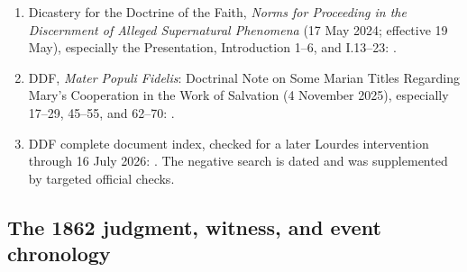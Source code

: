\begin{enumerate}
  \item Dicastery for the Doctrine of the Faith, \emph{Norms for Proceeding in the Discernment of Alleged Supernatural Phenomena} (17 May 2024; effective 19 May), especially the Presentation, Introduction 1--6, and I.13--23: .
  \item DDF, \emph{Mater Populi Fidelis}: Doctrinal Note on Some Marian Titles Regarding Mary's Cooperation in the Work of Salvation (4 November 2025), especially 17--29, 45--55, and 62--70: .
  \item DDF complete document index, checked for a later Lourdes intervention through 16 July 2026: . The negative search is dated and was supplemented by targeted official checks.
\end{enumerate}

\subsection{The 1862 judgment, witness, and event chronology}

